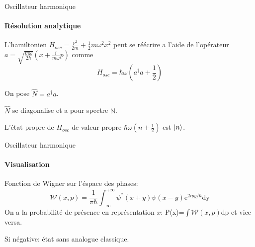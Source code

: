 \documentclass[11pt]{beamer}
\begin{document}
\begin{frame}{Oscillateur harmonique}
\framesubtitle{Résolution analytique}
L'hamiltonien $H_{osc}=\frac{p^2}{2m}+\frac 12 m\omega^2x^2$ peut se réécrire a l'aide de l'opérateur $\displaystyle a=\sqrt{\frac{m\omega}{2\hbar}}\left(x+\frac{i}{m\omega}p\right)$ comme 
\[
H_{osc}=\hbar\omega\left(a^{\dag}a+\frac 12\right)
\]

On pose $\hat{N}=a^{\dag}a$.

$\hat{N}$ se diagonalise et a pour spectre $\mathbb{N}$.

L'état propre de $H_{osc}$ de valeur propre $\hbar\omega(n+\frac 12)$ est $\ket{n}$.
\end{frame}

\begin{frame}{Oscillateur harmonique}
\framesubtitle{Visualisation}
Fonction de Wigner sur l'éspace des phases:
\[
\mathcal{W}(x,p)=\frac{1}{\pi\hbar}\int_{-\infty}^{+\infty}\psi^*(x+y)\psi(x-y)\textrm{e}^{2ipy/\hbar}\textrm{dy}
\]
On a la probabilité de présence en représentation $x$: P(x)=$\int\mathcal{W}(x,p)\textrm{dp}$ et vice versa.

Si négative: état sans analogue classique.
\end{frame}
\end{document}
